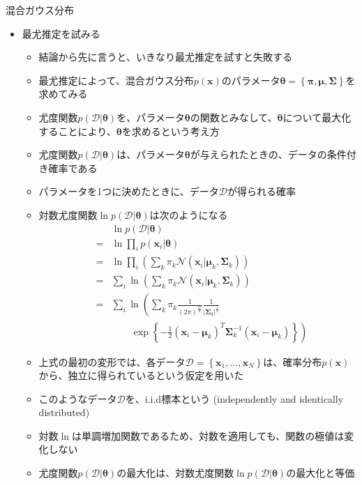 \documentclass[dvipdfmx,notheorems,t]{beamer}
\begin{document}
\begin{frame}{混合ガウス分布}

\begin{itemize}
	\item 最尤推定を試みる
	\begin{itemize}
		\item 結論から先に言うと、いきなり最尤推定を試すと\alert{失敗する}
		\newline
		\item \alert{最尤推定}によって、混合ガウス分布$p(\bm{x})$のパラメータ$\bm{\theta} = \left\{ \bm{\pi}, \bm{\mu}, \bm{\Sigma} \right\}$を求めてみる
		\item 尤度関数$p(\mathcal{D} | \bm{\theta})$を、パラメータ$\bm{\theta}$の関数とみなして、$\bm{\theta}$について最大化することにより、$\bm{\theta}$を求めるという考え方
		\newline
		\item 尤度関数$p(\mathcal{D} | \bm{\theta})$は、パラメータ$\bm{\theta}$が与えられたときの、データの条件付き確率である
		\item パラメータを1つに決めたときに、データ$\mathcal{D}$が得られる確率
		\newline
		\item 対数尤度関数$\ln p(\mathcal{D} | \bm{\theta})$は次のようになる
		\begin{eqnarray}
			&& \ln p(\mathcal{D} | \bm{\theta}) \nonumber \\
			&=& \ln \prod_i p(\bm{x}_i | \bm{\theta}) \nonumber \\
			&=& \ln \prod_i \left( \sum_k \pi_k \mathcal{N}(\bm{x}_i | \bm{\mu}_k, \bm{\Sigma}_k) \right) \nonumber \\
			&=& \sum_i \ln \left( \sum_k \pi_k \mathcal{N}(\bm{x}_i | \bm{\mu}_k, \bm{\Sigma}_k) \right) \nonumber \\
			&=& \sum_i \ln \left( \sum_k \pi_k \frac{1}{(2\pi)^\frac{D}{2}} \frac{1}{|\bm{\Sigma}_k|^\frac{1}{2}} \right. \nonumber \\
			&& \qquad \left. \exp \left\{ -\frac{1}{2} (\bm{x}_i - \bm{\mu}_k)^T \bm{\Sigma}_k^{-1} (\bm{x}_i - \bm{\mu}_k) \right\} \right)
		\end{eqnarray}
		\item 上式の最初の変形では、各データ$\mathcal{D} = \left\{ \bm{x}_1, \ldots, \bm{x}_N \right\}$は、確率分布$p(\bm{x})$から、\alert{独立に得られている}という仮定を用いた
		\item このようなデータ$\mathcal{D}$を、\alert{i.i.d標本}という (independently and identically distributed)
		\newline
		\item 対数$\ln$は単調増加関数であるため、対数を適用しても、関数の極値は変化しない
		\item 尤度関数$p(\mathcal{D} | \bm{\theta})$の最大化は、対数尤度関数$\ln p(\mathcal{D} | \bm{\theta})$の最大化と等価
	\end{itemize} \
	

\end{itemize}
\end{frame}
\end{document}

